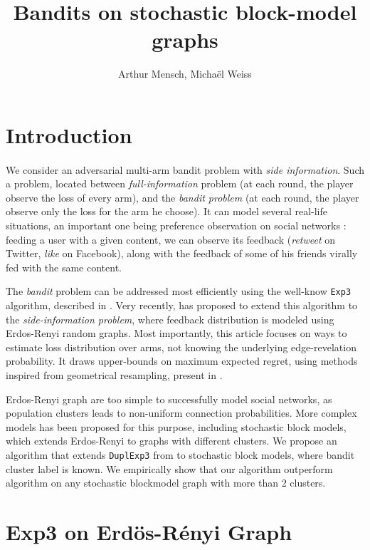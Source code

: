 \documentclass[11pt,a4paper]{article}
\title{Bandits on stochastic block-model graphs}
\author{Arthur Mensch, Michaël Weiss}
\begin{document}
\maketitle

\section{Introduction}
\paragraph{}We consider an adversarial multi-arm bandit problem with \textit{side information}. Such a problem, located between \textit{full-information} problem (at each round, the player observe the loss of every arm), and the \textit{bandit problem} (at each round, the player observe only the loss for the arm he choose). It can model several real-life situations, an important one being preference observation on social networks : feeding a user with a given content, we can observe its feedback (\textit{retweet} on Twitter, \textit{like} on Facebook), along with the feedback of some of his friends virally fed with the same content.

The \textit{bandit} problem can be addressed most efficiently using the well-know \verb|Exp3| algorithm, described in \cite{exp3}. Very recently, \cite{valko} has proposed to extend this algorithm to the \textit{side-information problem}, where feedback distribution is modeled using Erdos-Renyi random graphs. Most importantly, this article focuses on ways to estimate loss distribution over arms, not knowing the underlying edge-revelation probability. It draws upper-bounds on maximum expected regret, using methods inspired from geometrical resampling, present in \cite{neu}.

Erdos-Renyi graph are too simple to successfully model social networks, as population clusters leads to non-uniform connection probabilities. More complex models has been proposed for this purpose, including stochastic block models, which extends Erdos-Renyi to graphs with different clusters. We propose an algorithm that extends \verb|DuplExp3| from \cite{valko} to stochastic block models, where bandit cluster label is known. We empirically show that our algorithm outperform \cite{valko} algorithm on any stochastic blockmodel graph with more than $2$ clusters. 

\section{Exp3 on Erdös-Rényi Graph}
\end{document}
